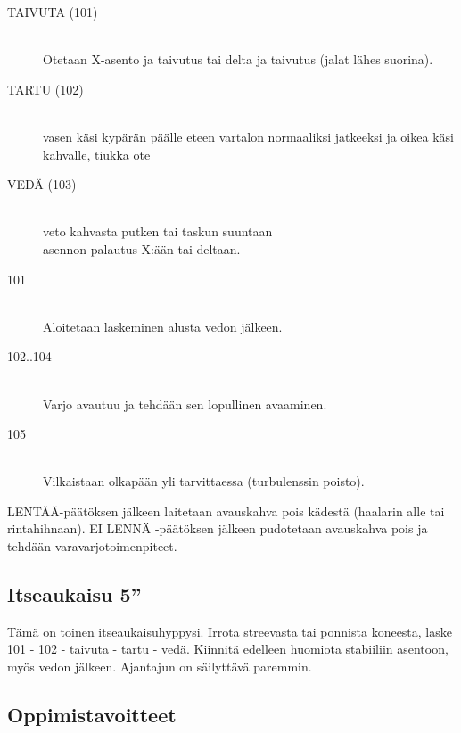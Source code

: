 \begin{multicols}{2}
\begin{description}
\item[TAIVUTA (101)] \hfill \\ 
Otetaan X-asento ja taivutus tai delta ja taivutus (jalat lähes suorina). \hfill \\ 
\item[TARTU (102)] \hfill \\ 
vasen käsi kypärän päälle eteen vartalon normaaliksi jatkeeksi ja oikea käsi kahvalle, tiukka ote \hfill \\ 
\item[VEDÄ (103)] \hfill \\ 
veto kahvasta putken tai taskun suuntaan \hfill \\ 
asennon palautus X:ään tai deltaan. \hfill \\ 
\item[101 ] \hfill \\ 
Aloitetaan laskeminen alusta vedon jälkeen. \hfill \\ 
\item[102..104 ] \hfill \\ 
Varjo avautuu ja tehdään sen lopullinen avaaminen. \hfill \\ 
\item[105 ] \hfill \\ 
Vilkaistaan olkapään yli tarvittaessa (turbulenssin poisto). \hfill \\ 
\end{description}

LENTÄÄ-päätöksen jälkeen laitetaan avauskahva pois kädestä (haalarin alle tai rintahihnaan). EI LENNÄ -päätöksen jälkeen pudotetaan avauskahva pois ja tehdään varavarjotoimenpiteet. 


\end{multicols}\pagebreak\begin{multicols}{2} 

\section{ Itseaukaisu 5'' }
\label{pl-alkeiskoulutuksen-suoritukset-itseaukaisu-5}


Tämä on toinen itseaukaisuhyppysi. Irrota streevasta tai ponnista koneesta, laske 101 - 102 - taivuta - tartu - vedä. Kiinnitä edelleen huomiota stabiiliin asentoon, myös vedon jälkeen. Ajantajun on säilyttävä paremmin. 

\subsection{ Oppimistavoitteet }
\label{pl-alkeiskoulutuksen-suoritukset-oppimistavoitteet}


\end{multicols}
